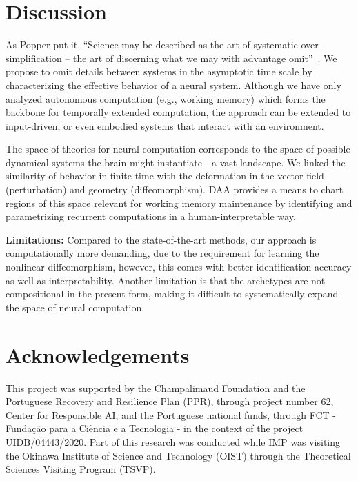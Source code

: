 \documentclass{article}
\theoremstyle{definition} \newtheorem{definition}{Definition}  \newtheorem{example}{Example}
\theoremstyle{remark} \newtheorem{remark}{Remark}
\newcounter{ct}
\begin{document}



\section{Discussion}
As Popper put it, ``Science may be described as the art of systematic over-simplification -- the art of discerning what we may with advantage omit''~\citep{Popper1988}.
We propose to omit details between systems in the asymptotic time scale by characterizing the effective behavior of a neural system.
Although we have only analyzed autonomous computation (e.g., working memory) which forms the backbone for temporally extended computation, the approach can be extended to input-driven, or even embodied systems that interact with an environment.

The space of theories for neural computation corresponds to the space of possible dynamical systems the brain might instantiate---a vast landscape.
We linked the similarity of behavior in finite time with the deformation in the vector field (perturbation) and geometry (diffeomorphism).
DAA provides a means to chart regions of this space relevant for working memory maintenance by identifying and parametrizing recurrent computations in a human-interpretable way.

\textbf{Limitations:}
Compared to the state-of-the-art methods, our approach is computationally more demanding, due to the requirement for learning the nonlinear diffeomorphism, however, this comes with better identification accuracy as well as interpretability.
Another limitation is that the archetypes are not compositional in the present form, making it difficult to systematically expand the space of neural computation.

\makeatletter
\if@submission
\makeatother
\else
\section*{Acknowledgements}
This project was supported by the Champalimaud Foundation and the Portuguese Recovery and Resilience Plan (PPR), through project number 62, Center for Responsible AI, and the Portuguese national funds, through FCT - Fundação para a Ciência e a Tecnologia - in the context of the project UIDB/04443/2020.
Part of this research was conducted while IMP was visiting the Okinawa Institute of Science and Technology (OIST) through the Theoretical Sciences Visiting Program (TSVP).
\fi
\end{document}
